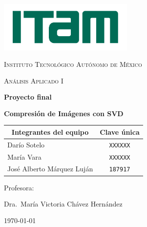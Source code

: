 \begin{titlepage}
	\centering
	\includegraphics[width=0.5\textwidth]{logo-ITAM.pdf}\par\vspace{1cm}
	{\scshape\large Instituto Tecnológico Autónomo de México \par}
	\vspace{2.5cm}
	
	{\scshape\Large Análisis Aplicado I\par}
	\vspace{1.5cm}
	{\LARGE\bfseries Proyecto final\par}
    \vspace{0.5cm}
	{\large\bfseries Compresión de Imágenes con SVD}
	\vspace{3cm}
	
	{\large
	\begin{tabular}{||l c||} 
         \hline
         \multicolumn{1}{||c}{\textbf{Integrantes del equipo}} & \textbf{Clave única} \\
         \hline\hline
         Darío Sotelo & \texttt{XXXXXX} \\ 
         \hline
         María Vara & \texttt{XXXXXX}\\
         \hline
         José Alberto Márquez Luján & \texttt{187917} \\
         \hline                  
    \end{tabular}
    }
	\vfill
	Profesora:\par
	Dra.~María Victoria Chávez Hernández

	\vfill
	{\today\par}
\end{titlepage}